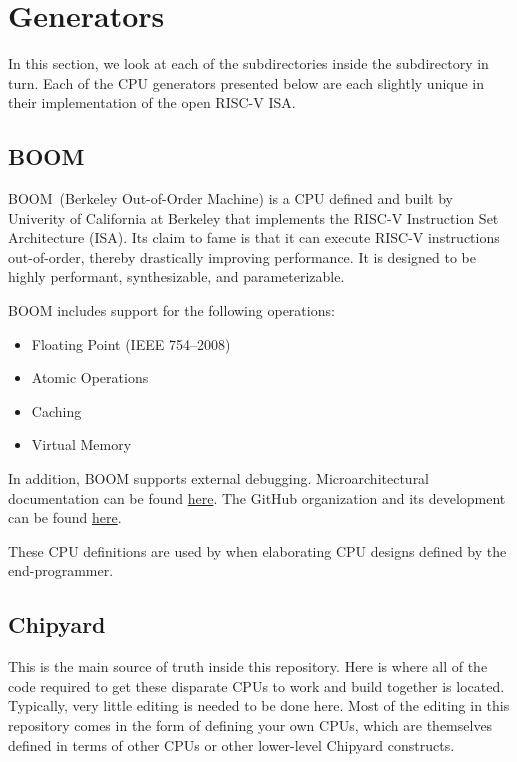 \section{Generators}\label{sec:Generators}
In this section, we look at each of the subdirectories inside the  subdirectory in turn.
Each of the CPU generators presented below are each slightly unique in their implementation of the open RISC-V ISA.\@

\subsection{BOOM}\label{sec:BOOM_Generator}
\nocite{boomHomepage}
BOOM~(Berkeley Out-of-Order Machine) is a CPU defined and built by Univerity of California at Berkeley that implements the RISC-V Instruction Set Architecture (ISA).
Its claim to fame is that it can execute RISC-V instructions out-of-order, thereby drastically improving performance.
It is designed to be highly performant, synthesizable, and parameterizable.

BOOM includes support for the following operations:
\begin{itemize}
\item Floating Point (IEEE 754--2008)
\item Atomic Operations
\item Caching
\item Virtual Memory
\end{itemize}
In addition, BOOM supports external debugging.
Microarchitectural documentation can be found \href{https://docs.boom-core.org/en/latest/}{here}.
The GitHub organization and its development can be found \href{https://github.com/riscv-boom}{here}.

These CPU definitions are used by  when elaborating CPU designs defined by the end-programmer.

\subsection{Chipyard}\label{sec:Chipyard_Generator}
This is the main source of truth inside this repository.
Here is where all of the code required to get these disparate CPUs to work and build together is located.
Typically, very little editing is needed to be done here.
Most of the editing in this repository comes in the form of defining your own CPUs, which are themselves defined in terms of other CPUs or other lower-level Chipyard constructs.

